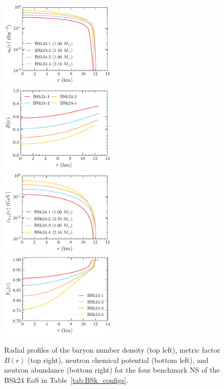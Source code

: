 \begin{figure}[tb]
    \centering
    \includegraphics[width=0.495\textwidth]{nb_BSk_prof.pdf}
    \includegraphics[width=0.495\textwidth]{B_BSk_prof.pdf}
    \includegraphics[width=0.495\textwidth]{epsFn_BSk_prof.pdf}
    \includegraphics[width=0.495\textwidth]{Yn_BSk_prof.pdf}
    \caption{Radial profiles of the baryon number density (top left), metric factor $B(r)$ (top right), neutron chemical potential (bottom left), and neutron abundance (bottom right) for the four benchmark NS of the BSk24 EoS in Table~\ref{tab:BSk_configs}.}
    \label{fig:BSk_profiles}
\end{figure}
    

